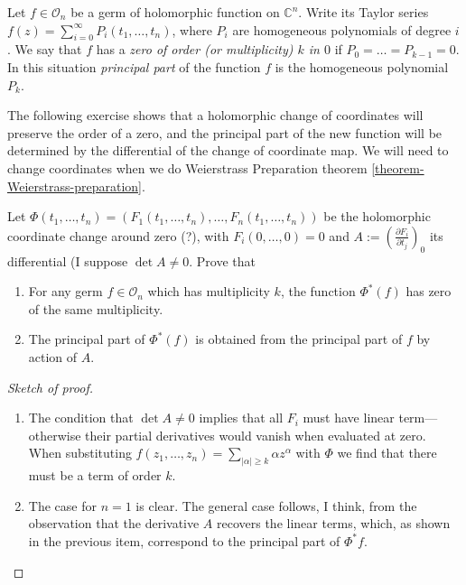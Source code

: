 \begin{definition}
\label{definition-zero-of-holomorphic-function-of-several-variables}
Let  $f\in \mathcal{O}_n$ be a germ of holomorphic function on $\mathbb{C}^n$.
Write its Taylor series $f(z)=\sum_{i=0}^\infty P_i(t_1,\ldots,t_n)$, where
$P_i$ are homogeneous polynomials of degree $i$. We say that $f$ has a {\it
zero of order (or multiplicity) $k$ in $0$} if $P_0=\ldots=P_{k-1}=0$. In this
situation {\it principal part} of the function $f$ is the homogeneous polynomial
$P_k$.
\end{definition}

The following exercise shows that a holomorphic change of coordinates will
preserve the order of a zero, and the principal part of the new function will be
determined by the differential of the change of coordinate map. We will need to
change coordinates when we do Weierstrass Preparation theorem
\ref{theorem-Weierstrass-preparation}.

\begin{exercise}
\label{exercise-principal-part-under-coordinate-change}
Let $\Phi(t_1,\ldots,t_n)=(F_1(t_1,\ldots,t_n),\ldots,F_n(t_1,\ldots,t_n))$ be
the holomorphic coordinate change around zero (?), with $F_i(0,\ldots,0)=0$ and
$A:=\left(\frac{\partial F_i}{\partial t_j}\right)_0$ its differential (I suppose
$\det A \neq 0$. Prove that
\begin{enumerate}
\item For any germ $f\in \mathcal{O}_n$ which has multiplicity $k$, the function
$\Phi^*(f)$ has zero of the same multiplicity.
\item The principal part of $\Phi^*(f)$ is obtained from the principal part of
$f$ by action of $A$.
\end{enumerate}
\end{exercise}

\begin{proof}[Sketch of proof]
\begin{enumerate}
\item The condition that $\det A \neq 0$ implies that all $F_i$ must have linear
term---otherwise their partial derivatives would vanish when evaluated at zero.
When substituting $f(z_1,\ldots,z_n)=\sum_{|\alpha|\geq k}\alpha z^\alpha$ with
$\Phi$ we find that there must be a term of order $k$.
\item The case for $n=1$ is clear. The general case follows, I think, from the
observation that the derivative $A$ recovers the linear terms, which, as shown
in the previous item, correspond to the principal part of $\Phi^*f$.
\end{enumerate}
\end{proof}

